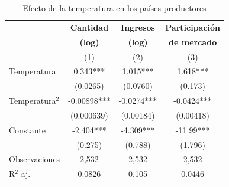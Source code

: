 \scriptsize
\begin{table}[H]
\centering
\caption{Efecto de la temperatura en los países productores}
\label{tab:motiv}
\begin{tabular}{lccc}
\hline
\hline

& \textbf{Cantidad} & \textbf{Ingresos} & \textbf{Participación} \\
& \textbf{(log)} & \textbf{(log)} & \textbf{de mercado} \\
& (1) & (2) & (3) \\
\midrule
Temperatura & 0.343*** & 1.015*** & 1.618*** \\
& (0.0265) & (0.0760) & (0.173) \\
Temperatura$^2$ & -0.00898*** & -0.0274*** & -0.0424*** \\
& (0.000639) & (0.00184) & (0.00418) \\
Constante & -2.404*** & -4.309*** & -11.99*** \\
& (0.275) & (0.788) & (1.796) \\
\midrule
Observaciones & 2,532 & 2,532 & 2,532 \\
R$^2$ aj. & 0.0826 & 0.105 & 0.0446 \\
\hline
\hline
\end{tabular}
\end{table}